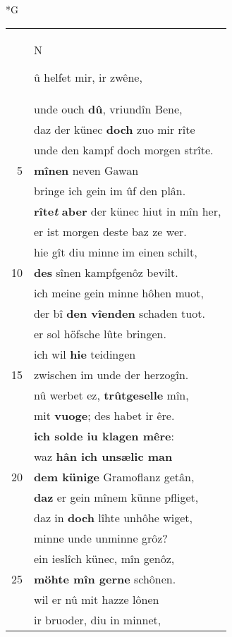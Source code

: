 \documentclass[8pt,a4paper,notitlepage]{article}
\begin{document}
\begin{table}[ht]
\begin{minipage}[t]{0.5\linewidth}
\small
\begin{center}*G
\end{center}
\begin{tabular}{rl}
 & \begin{large}N\end{large}û helfet mir, ir zwêne,\\ 
 & unde ouch \textbf{dû}, vriundîn Bene,\\ 
 & daz der künec \textbf{doch} zuo mir rîte\\ 
 & unde den kampf doch morgen strîte.\\ 
5 & \textbf{mînen} neven Gawan\\ 
 & bringe ich gein im ûf den plân.\\ 
 & \textbf{rîte\textit{t}} \textbf{aber} der künec hiut in mîn her,\\ 
 & er ist morgen deste baz ze wer.\\ 
 & hie gît diu minne im einen schilt,\\ 
10 & \textbf{des} sînen kampfgenôz bevilt.\\ 
 & ich meine gein minne hôhen muot,\\ 
 & der bî \textbf{den vîenden} schaden tuot.\\ 
 & er sol höfsche lûte bringen.\\ 
 & ich wil \textbf{hie} teidingen\\ 
15 & zwischen im unde der herzogîn.\\ 
 & nû werbet ez, \textbf{trûtgeselle} mîn,\\ 
 & mit \textbf{vuoge}; des habet ir êre.\\ 
 & \textbf{ich solde iu klagen mêre}:\\ 
 & waz \textbf{hân ich unsælic man}\\ 
20 & \textbf{dem künige} Gramoflanz getân,\\ 
 & \textbf{daz} er gein mînem künne pfliget,\\ 
 & daz in \textbf{doch} lîhte unhôhe wiget,\\ 
 & minne unde unminne grôz?\\ 
 & ein ieslîch künec, mîn genôz,\\ 
25 & \textbf{möhte mîn gerne} schônen.\\ 
 & wil er nû mit hazze lônen\\ 
 & ir bruoder, diu in minnet,\\ 

\end{tabular}
\end{minipage}
\end{table}
\end{document}
